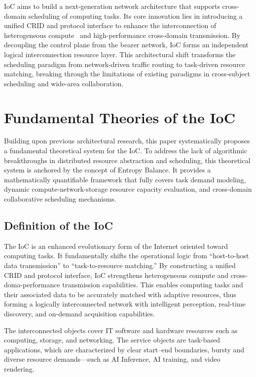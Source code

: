 \documentclass{ccjnl}
\begin{document}
IoC aims to build a next-generation network architecture that supports cross-domain scheduling of computing tasks. Its core innovation lies in introducing a unified CRID and protocol interface to enhance the interconnection of heterogeneous compute~\cite{18} and high-performance cross-domain transmission. By decoupling the control plane from the bearer network, IoC forms an independent logical interconnection resource layer. This architectural shift transforms the scheduling paradigm from network-driven traffic routing to task-driven resource matching, breaking through the limitations of existing paradigms in cross-subject scheduling and wide-area collaboration.

\section{Fundamental Theories of the IoC}
\label{s3}
Building upon previous architectural research, this paper systematically proposes a fundamental theoretical system for the IoC. To address the lack of algorithmic breakthroughs in distributed resource abstraction and scheduling, this theoretical system is anchored by the concept of Entropy Balance. It provides a mathematically quantifiable framework that fully covers task demand modeling, dynamic compute-network-storage resource capacity evaluation, and cross-domain collaborative scheduling mechanisms.

\subsection{Definition of the IoC}
\label{s3-1}
The IoC is an enhanced evolutionary form of the Internet oriented toward computing tasks. It fundamentally shifts the operational logic from “host-to-host data transmission” to “task-to-resource matching.” By constructing a unified CRID and protocol interface, IoC strengthens heterogeneous compute and cross-doma-performance transmission capabilities. This enables computing tasks and their associated data to be accurately matched with adaptive resources, thus forming a logically interconnected network with intelligent perception, real-time discovery, and on-demand acquisition capabilities.

The interconnected objects cover IT software and hardware resources such as computing, storage, and networking. The service objects are task-based applications, which are characterized by clear start–end boundaries, bursty and diverse resource demands—such as AI Inference, AI training, and video rendering.
\end{document}
